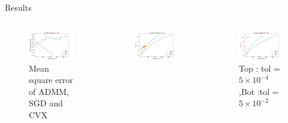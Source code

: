 \documentclass{beamer}
\begin{document}
\begin{frame}{Results}
\begin{columns}
\begin{figure}
    \centering
    \includegraphics[scale = 0.3]{MSE_TIME_1k_1K_2k.png}
    \caption{Mean square error of ADMM, SGD and CVX}
\end{figure}
\begin{figure}
    \centering
    \includegraphics[scale = 0.25]{ACC_TIME_1k_1k_2k.png}
\end{figure}
\begin{figure}
    \centering
    \includegraphics[scale = 0.25]{ACC_TIME_1k_1k_2k_SGD_Strong.png}
    \caption{Top : tol = $5 \times 10^{-4}$ ,Bot :tol = $5 \times 10^{-2}$}
\end{figure}
\end{columns}
\end{frame}
\end{document}
